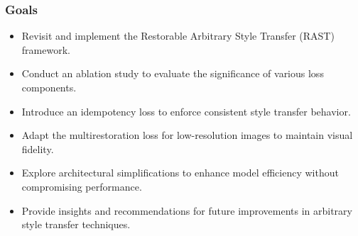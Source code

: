 \begin{frame}
\titlepage 
\end{frame}

\begin{frame}
\frametitle{Goals}

\begin{itemize}
    \item Revisit and implement the Restorable Arbitrary Style Transfer (RAST) framework.
    \item Conduct an ablation study to evaluate the significance of various loss components.
    \item Introduce an idempotency loss to enforce consistent style transfer behavior.
    \item Adapt the multirestoration loss for low-resolution images to maintain visual fidelity.
    \item Explore architectural simplifications to enhance model efficiency without compromising performance.
    \item Provide insights and recommendations for future improvements in arbitrary style transfer techniques.
\end{itemize}

\end{frame}
